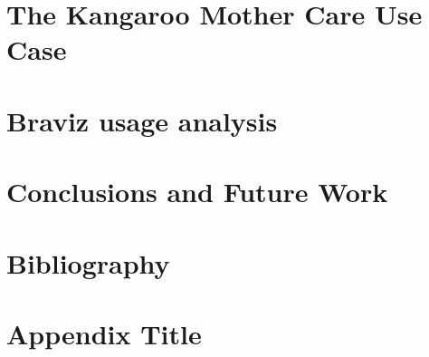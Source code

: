 \documentclass[12pt]{report}
\begin{document}
\chapter{The Kangaroo Mother Care Use Case}
\label{chap_kmc}


\chapter{Braviz usage analysis}
\label{chap_analysis}


\chapter{Conclusions and Future Work}
\label{chap_conclusions}


\chapter*{Bibliography}
\printbibliography

\appendix
\chapter{Appendix Title}
%
\end{document}
